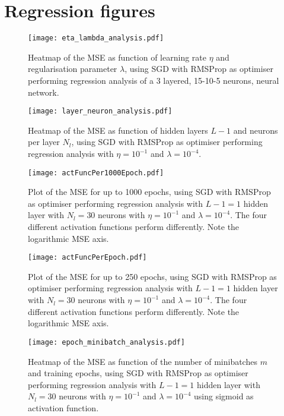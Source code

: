 \clearpage



\appendix

\section{Regression figures}\label{app:regression}

\begin{figure}[h!]
    \texttt{[image: eta\_lambda\_analysis.pdf]}
    \caption{Heatmap of the MSE as function of learning rate $\eta$ and regularisation parameter $\lambda$, using SGD with RMSProp as optimiser performing regression analysis of a 3 layered, 15-10-5 neurons, neural network. }
    \label{fig:reg_eta_lambda}
\end{figure}

\begin{figure}[h!]
    \texttt{[image: layer\_neuron\_analysis.pdf]}
    \caption{Heatmap of the MSE as function of hidden layers $L-1$ and neurons per layer $N_l$, using SGD with RMSProp as optimiser performing regression analysis with $\eta=10^{-1}$ and $\lambda=10^{-4}$.}
    \label{fig:reg_layer_neuron}
\end{figure}

\begin{figure}[h!]
    \texttt{[image: actFuncPer1000Epoch.pdf]}
    \caption{Plot of the MSE for up to 1000 epochs, using SGD with RMSProp as optimiser performing regression analysis with $L-1=1$ hidden layer with $N_l=30$ neurons with $\eta=10^{-1}$ and $\lambda=10^{-4}$. The four different activation functions perform differently. Note the logarithmic MSE axis.}
    \label{fig:reg_act_epoch1000}
\end{figure}

\begin{figure}[h!]
    \texttt{[image: actFuncPerEpoch.pdf]}
    \caption{Plot of the MSE for up to 250 epochs, using SGD with RMSProp as optimiser performing regression analysis with $L-1=1$ hidden layer with $N_l=30$ neurons with $\eta=10^{-1}$ and $\lambda=10^{-4}$. The four different activation functions perform differently. Note the logarithmic MSE axis.}
    \label{fig:reg_act_epoch}
\end{figure}

\begin{figure}[h!]
    \texttt{[image: epoch\_minibatch\_analysis.pdf]}
    \caption{Heatmap of the MSE as function of the number of minibatches $m$ and training epochs, using SGD with RMSProp as optimiser performing regression analysis with $L-1=1$ hidden layer with $N_l=30$ neurons with $\eta=10^{-1}$ and $\lambda=10^{-4}$ using sigmoid as activation function. }
    \label{fig:reg_minibatch_epoch}
\end{figure}




